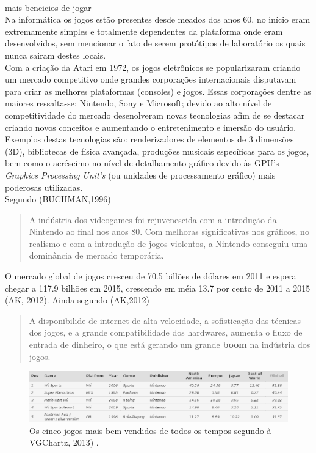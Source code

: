 \documentclass{article}
\begin{document}
\\mais beneicios de jogar
\\
Na informática os jogos estão presentes desde meados dos anos 60, no início eram extremamente simples e totalmente dependentes da plataforma onde eram desenvolvidos, sem mencionar o fato de serem protótipos de laboratório os quais nunca sairam destes locais. 
\\
Com a criação da Atari em 1972, os jogos eletrônicos se popularizaram criando um mercado competitivo onde grandes corporações internacionais disputavam para criar as melhores plataformas (consoles) e jogos.  Essas corporações dentre as maiores  ressalta-se: Nintendo, Sony e Microsoft; devido ao alto nível de competitividade do mercado desenolveram novas tecnologias afim de se destacar criando novos conceitos e aumentando o entretenimento e imersão do usuário. Exemplos destas tecnologias são: renderizadores de elementos de 3 dimensões (3D), bibliotecas de física avançada, produções musicais específicas para os jogos, bem como o acréscimo no nível de detalhamento gráfico devido às GPU's \textit{Graphics Processing Unit's} (ou unidades de processamento gráfico) mais poderosas utilizadas. 
\\
Segundo (BUCHMAN,1996) \begin{quote} A indústria dos videogames foi rejuvenescida com a introdução da Nintendo ao final nos anos 80. Com melhoras significativas  nos gráficos, no realismo e com a introdução de jogos violentos, a Nintendo conseguiu uma dominância de mercado temporária.
\end{quote}

O mercado global de jogos cresceu de 70.5 billões de dólares em 2011 e espera chegar a 117.9 bilhões em 2015, crescendo em méia 13.7 por cento de 2011 a 2015 (AK, 2012).
Ainda segundo (AK,2012) \begin{quote} A disponibilide de internet de alta velocidade, a sofisticação das técnicas dos jogos, e a grande compatibilidade dos hardwares, aumenta o fluxo de entrada de dinheiro, o que está gerando um grande \textbf{boom} na indústria dos jogos.\end{quote}

\begin{figure}[!htbp]
    \begin{center}
        \includegraphics[width=\textwidth]{asset/img/bestSelledGames.jpg}
               \caption{Os cinco jogos mais bem vendidos de todos os tempos segundo à VGChartz, 2013) . \label{fig:Jogos mais bem vendidos}}
    \end{center}
\end{figure}
\end{document}
